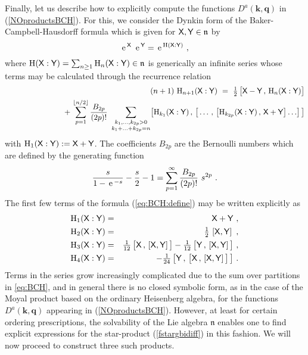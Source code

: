 \documentclass[11pt,a4paper]{article}
\newcommand{\cb}[2]{\left[#1,#2\right]}                 %
\newcommand{\mbf}[1]{{\boldsymbol {#1} }}
\def\X{{\sf X}}
\def\Y{{\sf Y}}
\def\mk{{\mbf k}}
\def\mq{{\mbf q}}
\def\mfn{{\mathfrak n}}
\def\e{{\,\rm e}\,}
\begin{document}
Finally, let us describe how to explicitly compute the functions
$D^a(\mk,\mq)$ in (\ref{NOproductsBCH}). For this, we consider the
Dynkin form of the Baker-Campbell-Hausdorff formula which is given for
$\X,\Y\in\mfn$ by
\begin{equation}
  \label{eq:BCH:define}
\e^\X~\e^\Y=\e^{\mathrm{H}(\X:\Y)} \ ,
\end{equation}
where $\mathrm{H}(\X:\Y)=\sum_{n\geq1}\mathrm{H}_n(\X:\Y)\in\mfn$ is
generically an infinite series whose terms may be calculated through the
recurrence relation
\begin{eqnarray}
  \label{eq:BCH}
&&(n+1)~\mathrm{H}_{n+1}(\X:\Y)~=~\mbox{$\frac 12$}\,\bigl[\X-\Y\,,\,
\mathrm{H}_n(\X:\Y)\bigr]
\nonumber  \\ &&~~~~~~~~~~~~~~~~~~~~
+\,\sum_{p=1}^{\lfloor n/2\rfloor}\frac{B_{2p}}{(2p)!}~
\sum_{\substack{k_1,\ldots,k_{2p}> 0 \\ k_1+\ldots+k_{2p}=n }}
\bigl[\mathrm{H}_{k_1}(\X:\Y)\,,\,\bigl[\,\ldots\,,\,\bigl[
\mathrm{H}_{k_{2p}}(\X:\Y)\,,\,\X+\Y\bigr]\ldots\bigr]\,\bigr]\nonumber\\
\end{eqnarray}
with $\mathrm{H}_1(\X:\Y):=\X+\Y$. The coefficients $B_{2p}$ are the
Bernoulli numbers which are defined by the generating function
\begin{equation}
  \label{eq:BCH:K}
  \frac{s}{1-\e^{-s}}-\frac s2-1=\sum_{p=1}^\infty\frac{B_{2p}}{(2p)!}
  ~s^{2p} \ .
\end{equation}
The first few terms of the formula (\ref{eq:BCH:define}) may be
written explicitly as
\begin{eqnarray}
  \label{eq:BCH:1}
  \mathrm{H}_1(\X:\Y)&=& \X+\Y \ , \nonumber\\
  \mathrm{H}_2(\X:\Y)&=&\mbox{$\frac 12$}\,\cb \X\Y \ , \nonumber \\
  \mathrm{H}_3(\X:\Y)&=&\mbox{$\frac 1{12}$}\,\bigl[\X\,,\,\cb \X\Y\,\bigr]
  -\mbox{$\frac 1{12}$}\,\bigl[\Y\,,\,\cb \X\Y\,\bigr] \ , \nonumber\\
  \mathrm{H}_4(\X:\Y)&=& -\mbox{$\frac 1{24}$}\,\bigl[\Y\,,\,\bigl[\X
  \,,\,\cb \X\Y\,\bigr]\,\bigr] \ .
\end{eqnarray}
Terms in the series grow increasingly complicated due to
the sum over partitions in \eqref{eq:BCH}, and in general there is no
closed symbolic form, as in the case of the Moyal product based on the
ordinary Heisenberg algebra, for the functions $D^a(\mk,\mq)$ appearing in
(\ref{NOproductsBCH}). However, at least for certain ordering
prescriptions, the solvability of the Lie algebra $\mfn$ enables one
to find explicit expressions for the star-product (\ref{fstargbidiff})
in this fashion. We will now proceed to construct three such
products.
\end{document}
